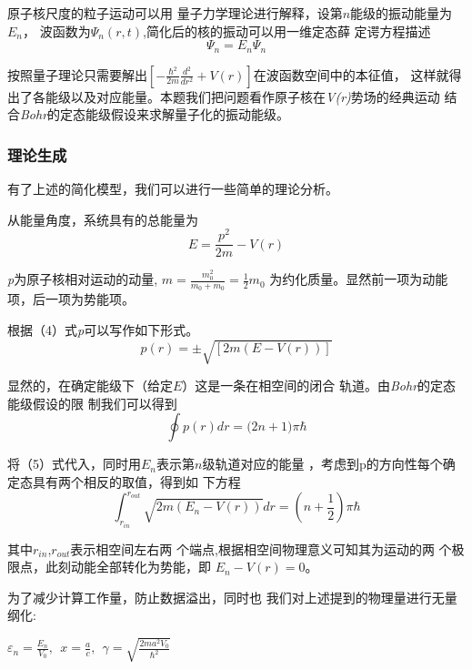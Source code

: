 \documentclass[11pt, a4paper, oneside]{ctexart}
\begin{document}
{{{{\setlength{\parindent}{3em}原子核尺度的粒子运动可以用
量子力学理论进行解释，设第$n$能级的振动能量为$E_n$，
波函数为$\Psi_n(r,t)$,简化后的核的振动可以用一维定态薛
定谔方程描述
\begin{equation}
	[-\frac{\hbar^2}{2m}\frac{d^2}{dr^2}+V(r)]\Psi_n=E_n\Psi_n
\end{equation}
\par 按照量子理论只需要解出$[-\frac{\hbar^2}{2m}\frac{d^2}{dr^2}+V(r)]$在波函数空间中的本征值，
这样就得出了各能级以及对应能量。本题我们把问题看作原子核在\emph{V(r)}势场的经典运动
结合\emph{Bohr}的定态能级假设来求解量子化的振动能级。
}

\subsubsection{理论生成}
{
    有了上述的简化模型，我们可以进行一些简单的理论分析。

    从能量角度，系统具有的总能量为
\begin{equation}
E=\frac {p^2}{2m}-V(r)
\end{equation}


    \emph{p}为原子核相对运动的动量,
    $m=\frac{m_0^2}{m_0+m_0}=\frac{1}{2}m_0$
    为约化质量。显然前一项为动能项，后一项为势能项。

    根据（4）式\emph{p}可以写作如下形式。
    \begin{equation}
        p(r)=\pm\sqrt{[2m(E-V(r))]}
    \end{equation}

    显然的，在确定能级下（给定$E$）这是一条在相空间的闭合
    轨道。由{\emph{Bohr}的定态能级假设}的限
    制我们可以得到
    \begin{equation}
        \oint p(r)dr=({2n+1)}\pi \hbar
    \end{equation}
    
    将（5）式代入，同时用$E_n$表示第$n$级轨道对应的能量
    ，考虑到p的方向性每个确定态具有两个相反的取值，得到如
    下方程
    \begin{equation}
        \int^{r_{out}}_{r_{in}}\sqrt{2m(E_n-V(r))}dr=(n+\frac{1}{2})\pi\hbar
    \end{equation}

    其中$r_{in}$,$r_{out}$表示相空间左右两
    个端点,根据相空间物理意义可知其为运动的两
    个极限点，此刻动能全部转化为势能，即
    $E_n-V(r)=0$。

    为了减少计算工作量，防止数据溢出，同时也
    我们对上述提到的物理量进行无量纲化:

    \begin{center}
        {$\varepsilon_n =\frac{E_n}{V_0},\ \ x=\frac a c ,\ \ \gamma=\sqrt{\frac{2ma^2V_0}{\hbar^2}}$}
    \end{center}

}}}}
\end{document}
